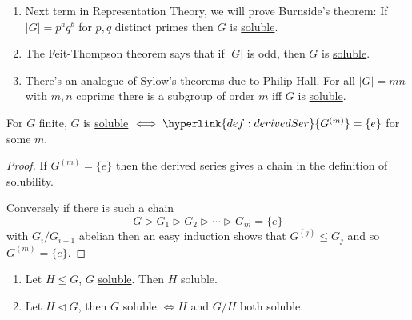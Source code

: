 \documentclass{article}
\begin{document}
\begin{remark}\leavevmode
    \begin{enumerate}[label=(\arabic*)]
        \item Next term in Representation Theory, we will prove Burnside's theorem: If $|G|=p^a q^b$ for $p,q$ distinct primes then $G$ is \hyperlink{def:soluble}{soluble}.
        \item The Feit-Thompson theorem says that if $|G|$ is odd, then $G$ is \hyperlink{def:soluble}{soluble}.
        \item There's an analogue of Sylow's theorems due to Philip Hall.
            For all $|G| = mn$ with $m,n$ coprime there is a subgroup of order $m$ iff $G$ is \hyperlink{def:soluble}{soluble}.
    \end{enumerate}
\end{remark}
\begin{nlemma}\label{lem:4.20}
    For $G$ finite, $G$ is \hyperlink{def:soluble}{soluble} $\iff \hyperlink{def:derivedSer}{G^{(m)}} = \{e\}$ for some $m$.
\end{nlemma}
\begin{proof}
    If $G^{(m)} = \{e\}$ then the derived series gives a chain in the definition of solubility.

    Conversely if there is such a chain
    \begin{equation*}
        G \rhd G_1 \rhd G_2 \rhd \dotsb \rhd G_m = \{e\}
    \end{equation*}
    with $G_i/G_{i+1}$ abelian then an easy induction shows that $G^{(j)} \leq G_j$ and so $G^{(m)} = \{e\}$.
\end{proof}
\begin{nlemma}\label{lem:4.21}\leavevmode
    \begin{enumerate}[label=(\roman*)]
        \item Let $H \leq G$, $G$ \hyperlink{def:soluble}{soluble}. Then $H$ soluble.
        \item Let $H \lhd G$, then $G$ soluble $\iff H$ and $G/H$ both soluble.
    \end{enumerate}
\end{nlemma}
\end{document}
